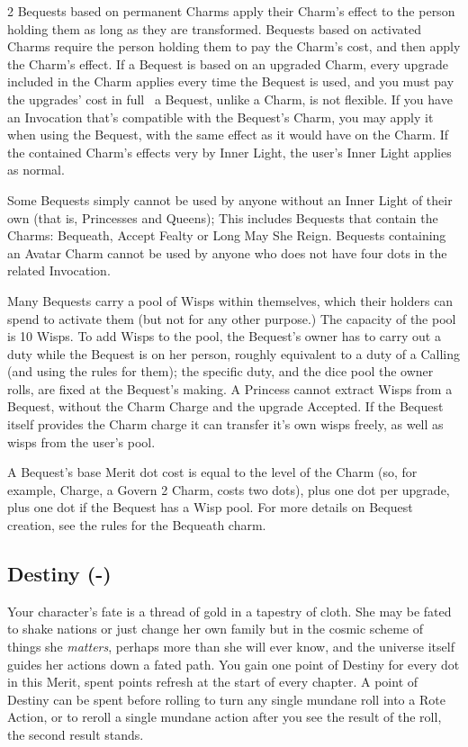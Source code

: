 \begin{multicols}{2}
Bequests based on permanent Charms apply their Charm's effect to the person holding them as long as they are transformed. Bequests based on activated Charms require the person holding them to pay the Charm's cost, and then apply the Charm's effect. If a Bequest is based on an upgraded Charm, every upgrade included in the Charm applies every time the Bequest is used, and you must pay the upgrades' cost in full \textendash\, a Bequest, unlike a Charm, is not flexible. If you have an Invocation that's compatible with the Bequest's Charm, you may apply it when using the Bequest, with the same effect as it would have on the Charm. If the contained Charm's effects very by Inner Light, the user's Inner Light applies as normal.

Some Bequests simply cannot be used by anyone without an Inner Light of their own (that is, Princesses and Queens); This includes Bequests that contain the Charms: Bequeath, Accept Fealty or Long May She Reign. Bequests containing an Avatar Charm cannot be used by anyone who does not have four dots in the related Invocation.

Many Bequests carry a pool of Wisps within themselves, which their holders can spend to activate them (but not for any other purpose.) The capacity of the pool is 10 Wisps. To add Wisps to the pool, the Bequest’s owner has to carry out a duty while the Bequest is on her person, roughly equivalent to a duty of a Calling (and using the rules for them); the specific duty, and the dice pool the owner rolls, are fixed at the Bequest’s making. A Princess cannot extract Wisps from a Bequest, without the Charm Charge and the upgrade Accepted. If the Bequest itself provides the Charm charge it can transfer it's own wisps freely, as well as wisps from the user's pool.

A Bequest's base Merit dot cost is equal to the level of the Charm (so, for example, Charge, a Govern 2 Charm, costs two dots), plus one dot per upgrade, plus one dot if the Bequest has a Wisp pool. For more details on Bequest creation, see the rules for the Bequeath charm.

\subsection*{Destiny (\textbullet\nobreak\hspace{.16667em}-\nobreak\hspace{.16667em}\textbullet\textbullet\textbullet\textbullet\textbullet)}

Your character’s fate is a thread of gold in a tapestry of cloth. She may be fated to shake nations or just change her own family but in the cosmic scheme of things she \textit{matters}, perhaps more than she will ever know, and the universe itself guides her actions down a fated path. You gain one point of Destiny for every dot in this Merit, spent points refresh at the start of every chapter. A point of Destiny can be spent before rolling to turn any single mundane roll into a Rote Action, or to reroll a single mundane action after you see the result of the roll, the second result stands. 


\end{multicols}
